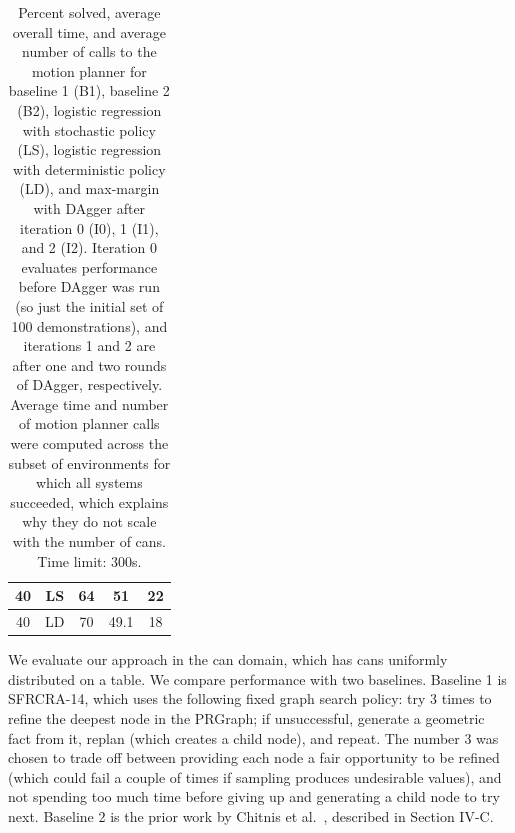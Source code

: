 \begin{table}[t]
{\begin{tabular}{ccccc}
    \midrule
      40 & LS & 64 & 51 & 22\\
    \midrule
      40 & LD & 70 & 49.1 & 18\\
    \bottomrule[1.5pt]
  \end{tabular}}
  \caption{\small{Percent solved, average overall time, and average number of calls to the motion
planner for baseline 1 (B1), baseline 2 (B2), logistic regression with stochastic policy (LS), logistic regression with deterministic policy (LD), and max-margin with DAgger after iteration 0 (I0), 1 (I1), and 2 (I2).
Iteration 0 evaluates performance before DAgger was run (so just the initial set of 100 demonstrations),
and iterations 1 and 2 are after one and two rounds of DAgger, respectively. Average time and number of
motion planner calls were computed across the subset of environments for which all systems succeeded, which
explains why they do not scale with the number of cans. Time limit: 300s.}}
  \label{table:results}
\end{table}

We evaluate our approach in the can domain, which has cans uniformly distributed on a table. We
compare performance with two baselines. Baseline 1 is SFRCRA-14, which uses the
following fixed graph search policy: try 3 times to refine the deepest
node in the PRGraph; if unsuccessful, generate a geometric fact from it, replan (which
creates a child node), and repeat. The number 3 was chosen to trade off between providing
each node a fair opportunity to be refined (which could fail a couple of times if sampling produces
undesirable values), and not spending too much time before giving up and generating a child node to try next.
Baseline 2 is the prior work by Chitnis et al.~\cite{chitnis2015mlpc}, described in Section IV-C.


